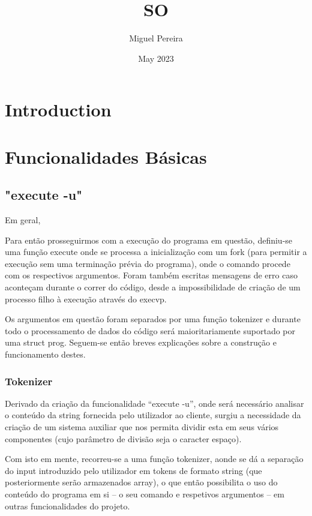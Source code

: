 \documentclass{report}
\title{SO}
\author{Miguel Pereira}
\date{May 2023}
\begin{document}
\maketitle

\section{Introduction}

\section{Funcionalidades Básicas}

\subsection{"execute -u"}

Em geral,

Para então prosseguirmos com a execução do programa em questão, definiu-se uma função execute onde se processa a inicialização com um fork (para permitir a execução sem uma terminação prévia do programa), onde o comando procede com os respectivos argumentos. Foram também escritas mensagens de erro caso aconteçam durante o correr do código, desde a impossibilidade de criação de um processo filho à execução através do execvp.

Os argumentos em questão foram separados por uma função tokenizer e durante todo o processamento de dados do código será maioritariamente suportado por uma struct prog. Seguem-se então breves explicações sobre a construção e funcionamento destes.

\subsubsection{Tokenizer}

Derivado da criação da funcionalidade “execute -u”, onde será necessário analisar o conteúdo da string fornecida pelo utilizador ao cliente, surgiu a necessidade da criação de um sistema auxiliar que nos permita dividir esta em seus vários componentes (cujo parâmetro de divisão seja o caracter espaço).

Com isto em mente, recorreu-se a uma função tokenizer, aonde se dá a separação do input introduzido pelo utilizador em tokens de formato string (que posteriormente serão armazenados array), o que então possibilita o uso do conteúdo do programa em si – o seu comando e respetivos argumentos – em outras funcionalidades do projeto.
\end{document}
